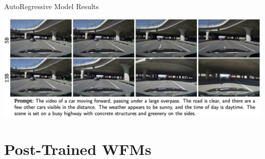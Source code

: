 \documentclass{beamer}
\begin{document}
\begin{frame}{AutoRegressive Model Results}
	\begin{center}
            \includegraphics[width=1.0\textwidth]{./img/auto_arch_results.png}
	\end{center}
\end{frame}

\section{Post-Trained WFMs }
\end{document}
